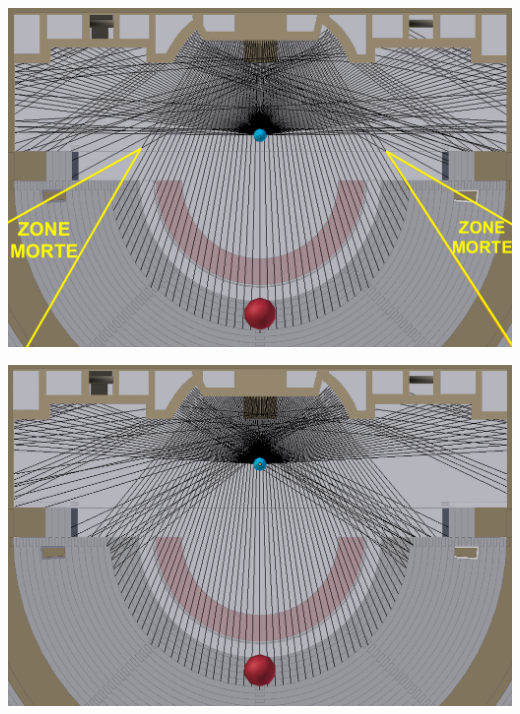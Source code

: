 \begin{figureth}
	\begin{subfigureth}{0.48\textwidth}
		\includegraphics[width=\linewidth]{images/test_source1}
		\caption{Réflexions des rayons sur le mur de scène pour une source située en [0 ; 3,6 ; 42,8].}
		\label{test_source1}
		\hfill
		\quad
	\end{subfigureth}
	\quad
	\begin{subfigureth}{0.48\textwidth}
		\includegraphics[width=\linewidth]{images/test_source2}
		\caption{Réflexions des rayons sur le mur de scène pour une source située en [0 ; 9 ; 42,8].}
		\label{test_source2}
		\quad
	\end{subfigureth} 
	\begin{subfigureth}{0.48\textwidth}

\end{subfigureth}
\end{figureth}
